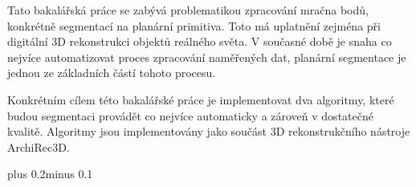 \documentclass[11pt,twoside,a4paper]{book}
\begin{document}

\baselineskip

\noindent
Tato bakalářská práce se zabývá problematikou zpracování mračna bodů, konkrétně segmentací na planární
primitiva. Toto má uplatnění zejména při digitální 3D rekonstrukci objektů reálného světa. V současné době je
snaha co nejvíce automatizovat proces zpracování naměřených dat, planární segmentace je jednou ze základních
částí tohoto procesu.

Konkrétním cílem této bakalářské práce je implementovat dva algoritmy, které budou segmentaci provádět co
nejvíce automaticky a zároveň v dostatečné kvalitě. Algoritmy jsou implementovány jako součást 3D
rekonstrukčního nástroje ArchiRec3D.

\tableofcontents

\listoffigures

\listoftables


\mainbodystarts
\normalfont
{}\baselineskip plus 0.2\baselineskip minus 0.1\baselineskip



% 
% 
\end{document}
